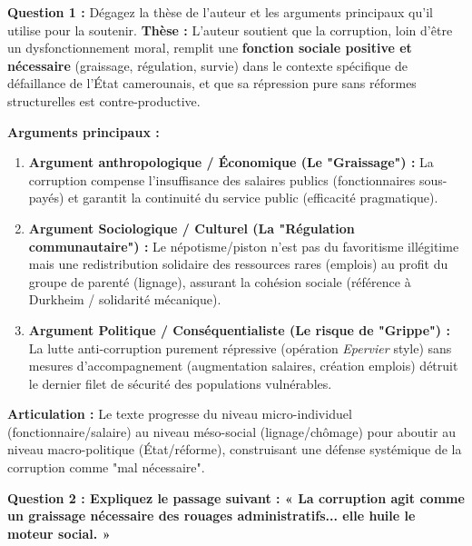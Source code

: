 \documentclass[11pt]{article}
\begin{document}
\begin{exoresolu}
\textbf{Question 1 :} Dégagez la thèse de l'auteur et les arguments principaux qu'il utilise pour la soutenir. \tcblower
\textbf{Thèse :} L'auteur soutient que la corruption, loin d'être un dysfonctionnement moral, remplit une \textbf{fonction sociale positive et nécessaire} (graissage, régulation, survie) dans le contexte spécifique de défaillance de l'État camerounais, et que sa répression pure sans réformes structurelles est contre-productive.

\textbf{Arguments principaux :}
\begin{enumerate}
    \item \textbf{Argument anthropologique / Économique (Le "Graissage") :} La corruption compense l'insuffisance des salaires publics (fonctionnaires sous-payés) et garantit la continuité du service public (efficacité pragmatique).
    \item \textbf{Argument Sociologique / Culturel (La "Régulation communautaire") :} Le népotisme/piston n'est pas du favoritisme illégitime mais une redistribution solidaire des ressources rares (emplois) au profit du groupe de parenté (lignage), assurant la cohésion sociale (référence à Durkheim / solidarité mécanique).
    \item \textbf{Argument Politique / Conséquentialiste (Le risque de "Grippe") :} La lutte anti-corruption purement répressive (opération \emph{Epervier} style) sans mesures d'accompagnement (augmentation salaires, création emplois) détruit le dernier filet de sécurité des populations vulnérables.
\end{enumerate}
\textbf{Articulation :} Le texte progresse du niveau micro-individuel (fonctionnaire/salaire) au niveau méso-social (lignage/chômage) pour aboutir au niveau macro-politique (État/réforme), construisant une défense systémique de la corruption comme "mal nécessaire".
\end{exoresolu}

\textbf{Question 2 : Expliquez le passage suivant : « La corruption agit comme un graissage nécessaire des rouages administratifs... elle huile le moteur social. »}
\end{document}
